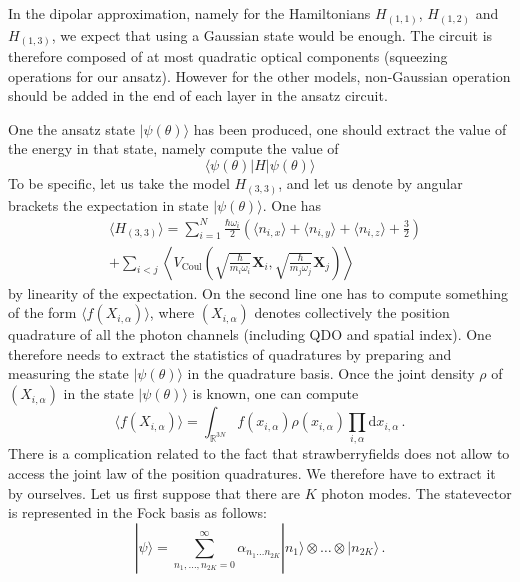 \documentclass[reprint, amsmath, amssymb, aps]{revtex4-2}
\begin{document}
    In the dipolar approximation, namely for the Hamiltonians $H_{(1,1)}$, $H_{(1,2)}$ and $H_{(1,3)}$, we expect that using a Gaussian state would be enough. The circuit is therefore composed of at most quadratic optical components (squeezing operations for our ansatz). However for the other models,  non-Gaussian operation should be added in the end of each layer in the ansatz circuit.

    One the ansatz state $|\psi(\theta)\rangle$ has been produced, one should extract the value of the energy in that state, namely compute the value of
    \begin{equation}
        \langle\psi(\theta)|H|\psi(\theta)\rangle
    \end{equation}
    To be specific, let us take the model $H_{(3,3)}$, and let us denote by angular brackets the expectation in state $|\psi(\theta)\rangle$. One has
    \begin{equation}
    \label{eq:loss}
    \begin{split}
        &\langle H_{(3,3)}\rangle = \sum_{i=1}^N\frac{\hbar\omega_i}{2}\left(\langle n_{i,x}\rangle+\langle n_{i,y}\rangle+\langle n_{i,z}\rangle+\frac{3}{2}\right)\\
        &+ \sum_{i<j}\left\langle V_\text{Coul}\left(\sqrt{\frac{\hbar}{m_i\omega_i}}\bm X_i, \sqrt{\frac{\hbar}{m_j\omega_j}}\bm X_j\right)\right\rangle
    \end{split}
    \end{equation}
    by linearity of the expectation. On the second line one has to compute something of the form $\langle f(X_{i,\alpha})\rangle$, where $(X_{i,\alpha})$ denotes collectively the position quadrature of all the photon channels (including QDO and spatial index). One therefore needs to extract the statistics of quadratures by preparing and measuring the state $|\psi(\theta)\rangle$ in the quadrature basis. Once the joint density $\rho$ of $(X_{i,\alpha})$ in the state $|\psi(\theta)\rangle$ is known, one can compute
    \begin{equation}
        \langle f(X_{i,\alpha})\rangle = \int_{\mathbb R^{3N}}f(x_{i,\alpha})\rho(x_{i,\alpha})\prod_{i,\alpha}\text{d}x_{i,\alpha}\,.
    \end{equation}
    There is a complication related to the fact that strawberryfields does not allow to access the joint law of the position quadratures. We therefore have to extract it by ourselves. Let us first suppose that there are $K$ photon modes. The statevector is represented in the Fock basis as follows:
    \begin{equation}
        |\psi\rangle = \sum_{n_1,\dots,n_{2K}=0}^\infty \alpha_{n_1\dots n_{2K}}|n_1\rangle\otimes\dots\otimes|n_{2K}\rangle\,.
    \end{equation}
\end{document}
